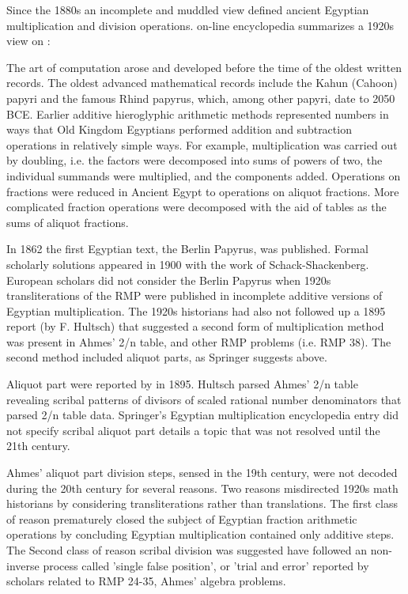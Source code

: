 \documentclass[12pt]{article}
\begin{document}
Since the 1880s an incomplete and muddled view defined ancient Egyptian multiplication and division operations.  on-line encyclopedia summarizes a 1920s view on :

The art of computation arose and developed before the time of the oldest written records. The oldest advanced mathematical records include the Kahun (Cahoon) papyri and the famous Rhind papyrus, which, among other papyri, date to 2050 BCE. Earlier additive hieroglyphic arithmetic methods represented numbers in ways that Old Kingdom Egyptians performed addition and subtraction operations in relatively simple ways. For example, multiplication was carried out by doubling, i.e. the factors were decomposed into sums of powers of two, the individual summands were multiplied, and the components added. Operations on fractions were reduced in Ancient Egypt to operations on aliquot fractions. More complicated fraction operations were decomposed with the aid of tables as the sums of aliquot fractions. 

In 1862 the first Egyptian text, the Berlin Papyrus, was published. Formal scholarly solutions appeared in 1900 with the work of Schack-Shackenberg. European scholars did not consider the Berlin Papyrus when 1920s transliterations of the RMP were published in incomplete additive versions of Egyptian multiplication. The 1920s historians had also not followed up a 1895 report (by F. Hultsch) that suggested a second form of multiplication method was present in Ahmes' 2/n table, and other RMP problems (i.e. RMP 38). The second method included aliquot parts, as Springer suggests above. 

Aliquot part were reported by  in 1895. Hultsch parsed Ahmes' 2/n table revealing scribal patterns of divisors of scaled rational number denominators that parsed 2/n table data. Springer's Egyptian multiplication encyclopedia entry did not specify scribal aliquot part details a topic that was not resolved until the 21th century.

Ahmes' aliquot part division steps, sensed in the 19th century, were not decoded during the 20th century for several reasons. Two reasons misdirected 1920s math historians by considering transliterations rather than translations. The first class of reason prematurely closed the subject of Egyptian fraction arithmetic operations by concluding Egyptian multiplication contained only additive steps. The Second class of reason scribal division was suggested have followed an non-inverse process called 'single false position', or 'trial and error' reported by scholars related to RMP 24-35, Ahmes' algebra problems. 
\end{document}
